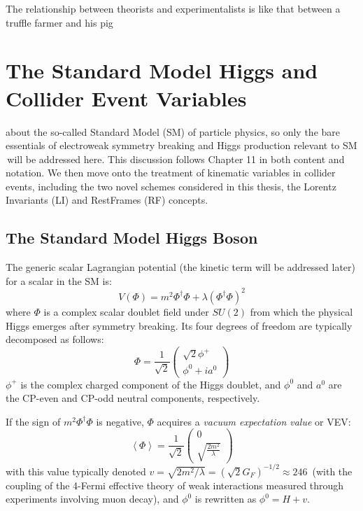 \begin{savequote}[75mm]
The relationship between theorists and experimentalists is like that between a truffle farmer and his pig%
\end{savequote}

\chapter{The Standard Model Higgs and Collider Event Variables}
\label{ch:theory}

 about the so-called Standard Model (SM) of particle physics, so only the bare essentials of electroweak symmetry breaking and Higgs production relevant to SM \vhbb\,will be addressed here.  This discussion follows \cite{pdg} Chapter 11 in both content and notation.  We then move onto the treatment of kinematic variables in collider events, including the two novel schemes considered in this thesis, the Lorentz Invariants (LI) and RestFrames (RF) concepts.

\section{The Standard Model Higgs Boson}
The generic scalar Lagrangian potential (the kinetic term will be addressed later) for a scalar in the SM is:
\begin{equation}
V\left(\Phi\right) = m^2\Phi^\dagger\Phi+\lambda\left(\Phi^\dagger\Phi\right)^2
\end{equation}
where $\Phi$ is a complex scalar doublet field  under $SU\left(2\right)$ from which the physical Higgs emerges after symmetry breaking.  Its four degrees of freedom are typically decomposed as follows:
\begin{equation}
\Phi = \frac{1}{\sqrt{2}} \left(\begin{array}{c} \sqrt{2}\phi^+\\ \phi^0 + ia^0 \end{array}\right)
\end{equation}
$\phi^+$ is the complex charged component of the Higgs doublet, and $\phi^0$ and $a^0$ are the CP-even and CP-odd neutral components, respectively.

If the sign of $m^2\Phi^\dagger\Phi$ is negative, $\Phi$ acquires a \emph{vacuum expectation value} or VEV:
\begin{equation}
\left<\Phi\right> = \frac{1}{\sqrt{2}} \left(\begin{array}{c} 0 \\ \sqrt{\frac{2m^2}{\lambda}} \end{array}\right)
\end{equation}
with this value typically denoted $v=\sqrt{2m^2/\lambda}=\left(\sqrt{2}G_F\right)^{-1/2}\approx246$ \GeV\,(with the coupling of the 4-Fermi effective theory of weak interactions measured through experiments involving muon decay), and $\phi^0$ is rewritten as $\phi^0=H+v$.

